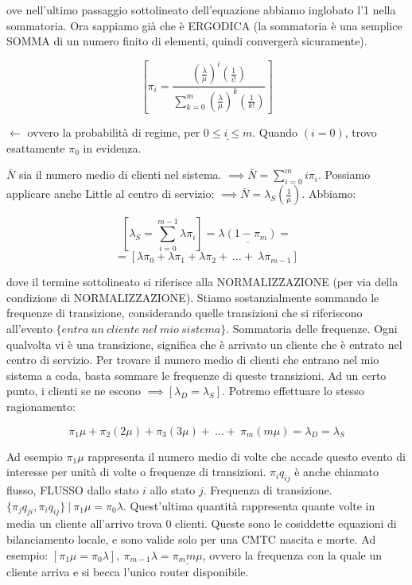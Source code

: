 ove nell'ultimo passaggio sottolineato dell'equazione abbiamo inglobato l'1 nella sommatoria. Ora sappiamo già che è ERGODICA (la sommatoria è una semplice SOMMA di un numero finito di elementi, quindi convergerà sicuramente).

\[
	[\pi_i = \frac{(\frac{\lambda}{\mu})^i (\frac{1}{i!})}{\sum_{k=0}^m{(\frac{\lambda}{\mu})^k (\frac{1}{k!})}}]
\]

$\leftarrow$ ovvero la probabilità di regime, per $\underline{0\leq i\leq m}$. Quando $(i=0)$, trovo esattamente $\pi_0$ in evidenza.

$\bar{N}$ sia il numero medio di clienti nel sistema. $\implies \bar{N}=\sum_{i=0}^m{i\pi_i}$. Possiamo applicare anche Little al centro di servizio: $\implies \bar{N}=\lambda_S(\frac{1}{\mu})$. Abbiamo:

\[
	[\lambda_S = \sum_{i=0}^{m-1}{\lambda\pi_i}] = \underline{\lambda(1-\pi_m)} =
\]
\[
	= [\lambda\pi_0 + \lambda\pi_1 + \lambda\pi_2+\ \dots+\ \lambda\pi_{m-1}]
\]

dove il termine sottolineato si riferisce alla NORMALIZZAZIONE (per via della condizione di NORMALIZZAZIONE). Stiamo sostanzialmente sommando le frequenze di transizione, considerando quelle transizioni che si riferiscono all'evento $\{entra\ un\ cliente\ nel\ mio\ sistema\}$. Sommatoria delle frequenze. Ogni qualvolta vi è una transizione, significa che è arrivato un cliente che è entrato nel centro di servizio. Per trovare il numero medio di clienti che entrano nel mio sistema a coda, basta sommare le frequenze di queste transizioni. Ad un certo punto, i clienti se ne escono $\implies [\lambda_D=\lambda_S]$. Potremo effettuare lo stesso ragionamento:

\[
	\pi_1\mu + \pi_2(2\mu) + \pi_3(3\mu) +\ \dots+\ \pi_m(m\mu) = \lambda_D = \lambda_S
\]

Ad esempio $\pi_1\mu$ rappresenta il numero medio di volte che accade questo evento di interesse per unità di volte o frequenze di transizioni. $\pi_iq_{ij}$ è anche chiamato flusso, FLUSSO dallo stato $i$ allo stato $j$. Frequenza di transizione. $\{\pi_jq_{ji},\pi_iq_{ij}\}\ |\ \pi_1\mu = \pi_0\lambda$. Quest'ultima quantità rappresenta quante volte in media un cliente all'arrivo trova 0 clienti. Queste sono le cosiddette equazioni di bilanciamento locale, e sono valide solo per una CMTC nascita e morte. Ad esempio: $[\pi_1\mu = \pi_0\lambda],\ \pi_{m-1}\lambda = \underline{\pi_m m\mu}$, ovvero la frequenza con la quale un cliente arriva e si becca l'unico router disponibile.

